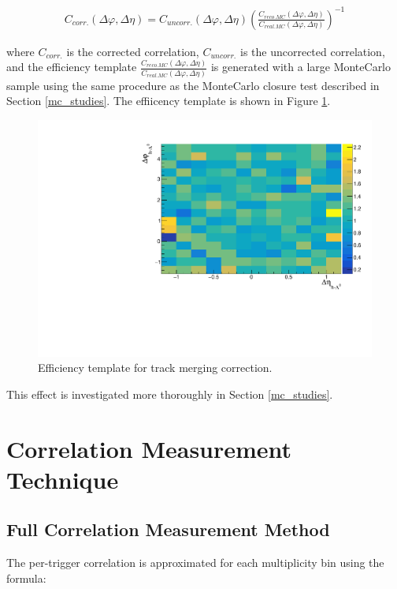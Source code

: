 \documentclass[ALICE,manyauthors]{ALICE_analysis_notes}
\begin{document}
\begin{align*}
	C_{corr.}(\Delta\varphi, \Delta\eta) = C_{uncorr.}(\Delta\varphi, \Delta\eta)(\frac{C_{reco. MC}(\Delta\varphi, \Delta\eta)}{C_{real. MC}(\Delta\varphi, \Delta\eta)})^{-1}
\end{align*}

where $C_{corr.}$ is the corrected correlation, $C_{uncorr.}$ is the uncorrected correlation, and the efficiency template $\frac{C_{reco. MC}(\Delta\varphi, \Delta\eta)}{C_{real. MC}(\Delta\varphi, \Delta\eta)}$ is generated with a large MonteCarlo sample using the same procedure as the MonteCarlo closure test described in Section \ref{mc_studies}. The effiicency template is shown in Figure \ref{trackmerge_efficiency_plot}.


\begin{figure}[ht]
\centering
\includegraphics[width=5in]{figures/trackmerge_efficiency_PLACEHOLDER.pdf}
\caption{Efficiency template for track merging correction.}
\label{trackmerge_efficiency_plot}
\end{figure}

This effect is investigated more thoroughly in Section \ref{mc_studies}.

\section{Correlation Measurement Technique}
\label{corrsec}
\subsection{Full Correlation Measurement Method}

The per-trigger correlation is approximated for each multiplicity bin using the formula:
\end{document}
